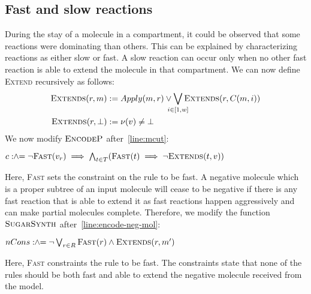 \subsection{Fast and slow reactions}
During the stay of a molecule in a compartment, it could be observed that some reactions were dominating than others. This can be explained by characterizing reactions as either slow or fast. A slow reaction can occur only when no other fast reaction is able to extend the molecule in that compartment. We can now define \textsc{Extend} recursively as follows:
\begin{align*}
  \textsc{Extends}(r, m) :=\;&   Apply(m,r) \lor
  \Lor_{\mathclap{i \in [1,w]}} \textsc{Extends}( r, C(m,i ) )\\
    \textsc{Extends}(r, \bot) :=\;&  \nu(v) \neq \bot
  \end{align*}
We now modify $\textsc{EncodeP}$ after~\ref{line:mcut}:
\begin{algorithmic}[1]
  \vspace{1ex}
  \State $c \mathrel{:\hspace{-3pt}\land\hspace{-3pt}=} \lnot \textsc{Fast}(v_r) \implies 
  \bigwedge_{t \in T} (\textsc{Fast}(t) \implies \lnot\textsc{Extends}(t,v))$
  \vspace{1ex}
\end{algorithmic}
Here, \textsc{Fast} sets the constraint on the rule to be fast.
A negative molecule which is a proper subtree of an input molecule will cease to be negative if there is any fast reaction that is able to extend it as fast reactions happen aggressively and can make partial molecules complete. Therefore, we modify the function $\textsc{SugarSynth}$ after~\ref{line:encode-neg-mol}:
\begin{algorithmic}[1]
  \vspace{1ex}
  \State $nCons \mathrel{:\hspace{-3pt}\land\hspace{-3pt}=}
  \lnot  \bigvee_{r \in R} \textsc{Fast}(r) \land \textsc{Extends}(r,m')$
  \vspace{1ex}
\end{algorithmic}
Here, \textsc{Fast} constraints the rule to be fast. The constraints state that none of the rules should be both fast and able to extend the negative molecule received from the model.

